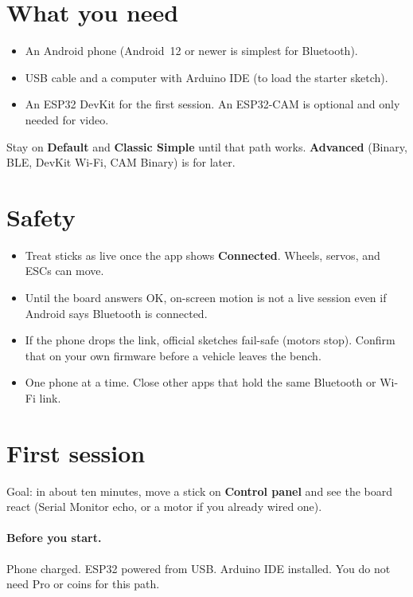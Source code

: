 \documentclass[12pt,a4paper]{article}
\newcommand{\ui}[1]{\textsf{\textbf{#1}}}
\begin{document}
\section{What you need}
\label{sec:need}

\begin{itemize}[leftmargin=1.4cm]
  \item An Android phone (Android~12 or newer is simplest for Bluetooth).
  \item USB cable and a computer with Arduino IDE (to load the starter sketch).
  \item An ESP32 DevKit for the first session.
        An ESP32-CAM is optional and only needed for video.
\end{itemize}

Stay on \ui{Default} and \ui{Classic Simple} until that path works.
\ui{Advanced} (Binary, BLE, DevKit Wi-Fi, CAM Binary) is for later.

\section{Safety}
\label{sec:safety}

\begin{itemize}[leftmargin=1.4cm]
  \item Treat sticks as live once the app shows \ui{Connected}.
        Wheels, servos, and ESCs can move.
  \item Until the board answers OK, on-screen motion is not a live session
        even if Android says Bluetooth is connected.
  \item If the phone drops the link, official sketches fail-safe
        (motors stop). Confirm that on your own firmware before a vehicle
        leaves the bench.
  \item One phone at a time. Close other apps that hold the same Bluetooth
        or Wi-Fi link.
\end{itemize}

\section{First session}
\label{sec:first}

Goal: in about ten minutes, move a stick on \ui{Control panel} and see the
board react (Serial Monitor echo, or a motor if you already wired one).

\paragraph{Before you start.}
Phone charged. ESP32 powered from USB. Arduino IDE installed.
You do not need Pro or coins for this path.
\end{document}
